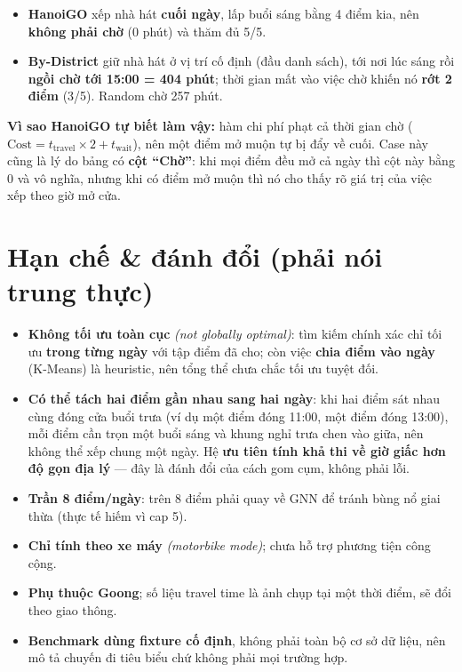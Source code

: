 \documentclass[12pt,a4paper]{article}
\newcommand{\en}[1]{\textit{(#1)}}            %
\begin{document}
\begin{itemize}[nosep]
  \item \textbf{HanoiGO} xếp nhà hát \textbf{cuối ngày}, lấp buổi sáng bằng 4 điểm
  kia, nên \textbf{không phải chờ} (0 phút) và thăm đủ 5/5.
  \item \textbf{By-District} giữ nhà hát ở vị trí cố định (đầu danh sách), tới nơi
  lúc sáng rồi \textbf{ngồi chờ tới 15:00 = 404 phút}; thời gian mất vào việc chờ
  khiến nó \textbf{rớt 2 điểm} (3/5). Random chờ 257 phút.
\end{itemize}

\textbf{Vì sao HanoiGO tự biết làm vậy:} hàm chi phí phạt cả thời gian chờ
($\text{Cost} = t_{\text{travel}}\times 2 + t_{\text{wait}}$), nên một điểm mở
muộn tự bị đẩy về cuối. Case này cũng là lý do bảng có \textbf{cột ``Chờ''}: khi
mọi điểm đều mở cả ngày thì cột này bằng 0 và vô nghĩa, nhưng khi có điểm mở muộn
thì nó cho thấy rõ giá trị của việc xếp theo giờ mở cửa.

\section{Hạn chế \& đánh đổi (phải nói trung thực)}

\begin{itemize}[nosep]
  \item \textbf{Không tối ưu toàn cục} \en{not globally optimal}: tìm kiếm chính
  xác chỉ tối ưu \textbf{trong từng ngày} với tập điểm đã cho; còn việc
  \textbf{chia điểm vào ngày} (K-Means) là heuristic, nên tổng thể chưa chắc tối
  ưu tuyệt đối.
  \item \textbf{Có thể tách hai điểm gần nhau sang hai ngày}: khi hai điểm sát
  nhau cùng đóng cửa buổi trưa (ví dụ một điểm đóng 11:00, một điểm đóng 13:00),
  mỗi điểm cần trọn một buổi sáng và khung nghỉ trưa chen vào giữa, nên không thể
  xếp chung một ngày. Hệ \textbf{ưu tiên tính khả thi về giờ giấc hơn độ gọn địa
  lý} --- đây là đánh đổi của cách gom cụm, không phải lỗi.
  \item \textbf{Trần 8 điểm/ngày}: trên 8 điểm phải quay về GNN để tránh bùng nổ
  giai thừa (thực tế hiếm vì cap 5).
  \item \textbf{Chỉ tính theo xe máy} \en{motorbike mode}; chưa hỗ trợ phương
  tiện công cộng.
  \item \textbf{Phụ thuộc Goong}; số liệu travel time là ảnh chụp tại một thời
  điểm, sẽ đổi theo giao thông.
  \item \textbf{Benchmark dùng fixture cố định}, không phải toàn bộ cơ sở dữ
  liệu, nên mô tả chuyến đi tiêu biểu chứ không phải mọi trường hợp.
\end{itemize}
\end{document}
